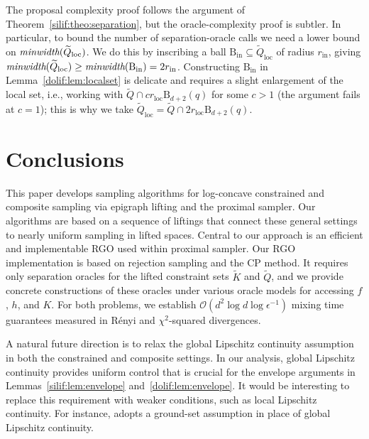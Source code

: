 \documentclass[11pt,letterpaper]{article}
\newcommand{\ball}{\mathrm{B}}
\newcommand{\local}{\mathrm{loc}}
\newcommand{\K}{\widetilde{K}}
\newcommand{\Q}{\widetilde{Q}}
\newcommand{\rin}{r_{\mathrm{in}}}
\newcommand{\brac}[1]{\left( #1\right)}
\begin{document}
The proposal complexity proof follows the argument of Theorem~\ref{silif:theo:separation}, but the oracle-complexity proof is subtler. In particular, to bound the number of separation-oracle calls we need a lower bound on $\mbox{\em minwidth}(\Q_{\local})$. We do this by inscribing a ball $\ball_{\mathrm{in}}\subseteq \Q_{\local}$ of radius $\rin$, giving $\mbox{\em minwidth}(\Q_{\local})\ge \mbox{\em minwidth}(\ball_{\mathrm{in}})=2\rin$. Constructing $\ball_{\mathrm{in}}$ in Lemma~\ref{dolif:lem:localset} is delicate and requires a slight enlargement of the local set, i.e., working with $\Q\cap c r_{\local}\ball_{d+2}(q)$ for some $c>1$ (the argument fails at $c=1$); this is why we take $\Q_{\local}=\Q\cap 2r_{\local}\ball_{d+2}(q)$.




\section{Conclusions}

This paper develops sampling algorithms for log-concave constrained and composite sampling via epigraph lifting and the proximal sampler.
Our algorithms are based on a sequence of liftings that connect these general settings to nearly uniform sampling in lifted spaces. Central to our approach is an efficient and implementable RGO used within proximal sampler.
Our RGO implementation is based on rejection sampling and the CP method. It requires only separation oracles for the lifted constraint sets $\K$ and $\Q$, and we provide concrete constructions of these oracles under various oracle models for accessing $f$, $h$, and $K$.
For both problems, we establish $\mathcal{O}\brac{d^2\log d \log \epsilon^{-1}}$ mixing time guarantees measured in Rényi and $\chi^2$-squared divergences.

A natural future direction is to relax the global Lipschitz continuity assumption in both the constrained and composite settings. In our analysis, global Lipschitz continuity provides uniform control that is crucial for the envelope arguments in Lemmas~\ref{silif:lem:envelope} and~\ref{dolif:lem:envelope}. It would be interesting to replace this requirement with weaker conditions, such as local Lipschitz continuity. For instance, \cite{kook2025algodiffusion} adopts a ground-set assumption in place of global Lipschitz continuity.
\end{document}
